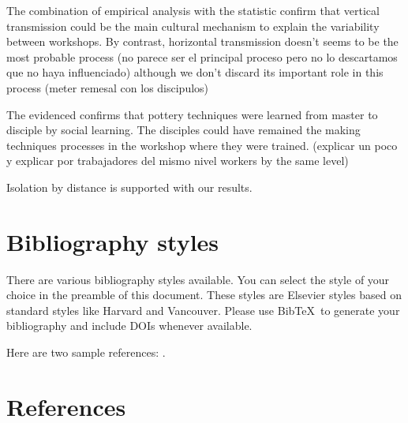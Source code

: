 \documentclass[review]{elsarticle}
\begin{document}
The combination of empirical analysis with the statistic confirm that vertical transmission could be the main cultural mechanism to explain the variability between workshops. By contrast, horizontal transmission doesn't seems to be the most probable process (no parece ser el principal proceso pero no lo descartamos que no haya influenciado) although we don't discard its important role in this process (meter remesal con los discipulos)

The evidenced confirms that pottery techniques were learned from master to disciple by social learning. The disciples could have remained the making techniques processes in the workshop where they were trained. (explicar un poco y explicar por trabajadores del mismo nivel workers by the same level)


Isolation by distance is supported with our results. 





\section{Bibliography styles}

There are various bibliography styles available. You can select the style of your choice in the preamble of this document. These styles are Elsevier styles based on standard styles like Harvard and Vancouver. Please use Bib\TeX\ to generate your bibliography and include DOIs whenever available.

Here are two sample references: \cite{Feynman1963118,Dirac1953888}.

\section*{References}


\end{document}
